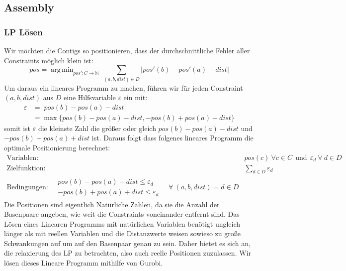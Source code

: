 \documentclass[12pt,ngerman,titlepage,a4paper]{article}
\DeclareMathOperator*{\argmin}{arg\,min}
\begin{document}
\subsection{Assembly}
\subsubsection*{LP Lösen} Wir möchten die Contigs so positionieren, dass der durchschnittliche Fehler aller Constraints möglich klein ist:
\[ pos = \argmin_{pos': C \rightarrow \mathbb{N}} \ \sum_{(a,b,dist) \in D} |pos'(b) - pos'(a) - dist| \]
Um daraus ein lineares Programm zu machen, führen wir für jeden Constraint $(a,b,dist)$ aus $D$ eine Hilfsvariable $\varepsilon$ ein mit:
\begin{align*}
 \varepsilon &= |pos(b) - pos(a) - dist|\\
  &= \max \{pos(b) - pos(a) - dist, -pos(b) + pos(a) + dist \} 
\end{align*}
somit ist $\varepsilon$ die kleinste Zahl die größer oder gleich $pos(b) - pos(a) - dist$ und $-pos(b) + pos(a) + dist$ ist. Daraus folgt dass folgenes lineares Programm die optimale Positionierung berechnet:
\begin{align*}
	\text{Variablen:}\quad& pos(c) \ \forall c \in C \ \ \text{und} \ \ \varepsilon_{d}  \ \forall \ d \in D\\
	\text{Zielfunktion:}\quad& \sum_{d \in D} \varepsilon_{d}\\
	\text{Bedingungen:}\quad \begin{split} pos(b) - pos(a) - dist \leq \varepsilon_{d}\\
	                                      -pos(b) + pos(a) + dist \leq \varepsilon_{d} \end{split}\quad \forall \ (a,b,dist) = d \in D
\end{align*}
Die Positionen sind eigentlich Natürliche Zahlen, da sie die Anzahl der Basenpaare angeben, wie weit die Constraints voneinander entfernt sind. Das Lösen eines Linearen Programms mit natürlichen Variablen benötigt ungleich länger als mit reellen Variablen und die Distanzwerte weisen sowieso zu große Schwankungen auf um auf den Basenpaar genau zu sein. Daher bietet es sich an, die relaxierung des LP zu betrachten, also auch reelle Positionen zuzulassen.
Wir lösen dieses Lineare Programm mithilfe von Gurobi.
\end{document}

